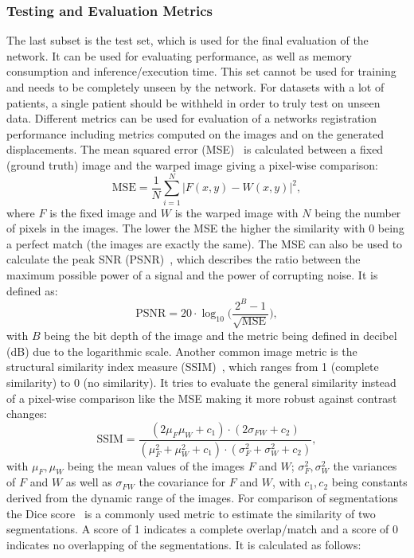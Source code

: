 \subsubsection{Testing and Evaluation Metrics} \label{SubSubSec:TestingEvalutionMetrics}
The last subset is the test set, which is used for the final evaluation of the network. It can be used for evaluating performance, as well as memory consumption and inference/execution time. This set cannot be used for training and needs to be completely unseen by the network. For datasets with a lot of patients, a single patient should be withheld in order to truly test on unseen data. Different metrics can be used for evaluation of a networks registration performance including metrics computed on the images and on the generated displacements. The mean squared error (MSE)~\cite{Chen2020} is calculated between a fixed (ground truth) image and the warped image giving a pixel-wise comparison:
\begin{equation}
	\text{MSE} = \frac{1}{N} \sum_{i=1}^{N} |F(x,y) - W(x,y)|^2,
\end{equation}
where $F$ is the fixed image and $W$ is the warped image with $N$ being the number of pixels in the images. The lower the MSE the higher the similarity with 0 being a perfect match (the images are exactly the same). The MSE can also be used to calculate the peak SNR (PSNR)~\cite{Ghoul2024}, which describes the ratio between the maximum possible power of a signal and the power of corrupting noise. It is defined as:
\begin{equation}
	\text{PSNR} = 20 \cdot \log_{10} \bigg(\frac{2^B - 1}{\sqrt{\text{MSE}}} \bigg),
\end{equation}
with $B$ being the bit depth of the image and the metric being defined in decibel (dB) due to the logarithmic scale. Another common image metric is the structural similarity index measure (SSIM)~\cite{SSIM}, which ranges from 1 (complete similarity) to 0 (no similarity). It tries to evaluate the general similarity instead of a pixel-wise comparison like the MSE making it more robust against contrast changes:
\begin{equation}
	\text{SSIM} = \frac{(2 \mu_F \mu_W + c_1) \cdot (2 \sigma_{FW} + c_2)}{(\mu_F^2 + \mu_W^2 + c_1) \cdot (\sigma_F^2 + \sigma_W^2 + c_2) },
\end{equation}
with $\mu_F, \mu_W$ being the mean values of the images $F$ and $W$; $\sigma_F^2, \sigma_W^2$ the variances of $F$ and $W$ as well as $\sigma_{FW}$ the covariance for $F$ and $W$, with $c_1, c_2$ being constants derived from the dynamic range of the images. For comparison of segmentations the Dice score~\cite{Xiao2021} is a commonly used metric to estimate the similarity of two segmentations. A score of 1 indicates a complete overlap/match and a score of 0 indicates no overlapping of the segmentations. It is calculated as follows:
